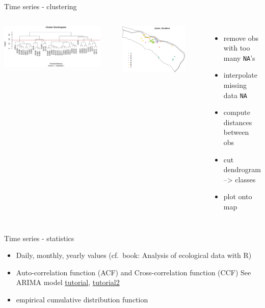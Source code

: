 \documentclass[8pt,ignorenonframetext,]{beamer}
\providecommand{\tightlist}{%
  \setlength{\itemsep}{0pt}\setlength{\parskip}{0pt}}
\newcommand{\columnsbegin}{\begin{columns}}
\newcommand{\columnsend}{\end{columns}}
\begin{document}
\begin{frame}[fragile]{Time series - clustering}

\columnsbegin
{}

\includegraphics[width=0.90000\textwidth]{imgPres/ts_cluster_dendo.png}

\includegraphics[width=0.80000\textwidth]{imgPres/ts_cluster_map.png}

\begin{itemize}
\tightlist
\item
  remove obs with too many \texttt{NA}'s
\item
  interpolate missing data \texttt{NA}
\item
  compute distances between obs
\item
  cut dendrogram --\textgreater{} classes
\item
  plot onto map
\end{itemize}

\columnsend

\end{frame}

\begin{frame}{Time series - statistics}

\begin{itemize}
\tightlist
\item
  Daily, monthly, yearly values (cf.~book: Analysis of ecological data
  with R)
\item
  Auto-correlation function (ACF) and Cross-correlation function (CCF)
  See ARIMA model
  \href{https://www.analyticsvidhya.com/blog/2015/12/complete-tutorial-time-series-modeling/}{tutorial},
  \href{http://a-little-book-of-r-for-time-series.readthedocs.io/en/latest/src/timeseries.html}{tutorial2}
\item
  empirical cumulative distribution function
\end{itemize}

\end{frame}
\end{document}
